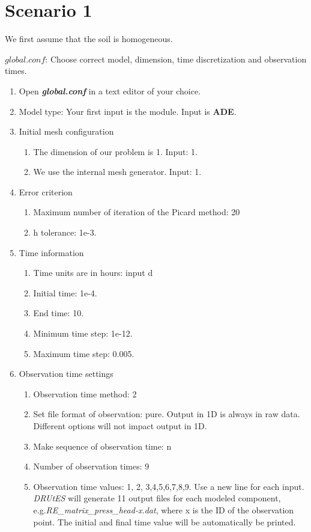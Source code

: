 \section*{Scenario 1}

We first assume that the soil is homogeneous.

$global.conf$: Choose correct model, dimension, time discretization and observation times.
\begin{enumerate}
\item Open \textbf{\emph{global.conf}} in a text editor of your choice. 
\item Model type: Your first input is the module. Input is \textbf{ADE}.
\item Initial mesh configuration \begin{enumerate}
\item The dimension of our problem is 1. Input: 1.
\item We use the internal mesh generator. Input: 1. 
\end{enumerate}
\item Error criterion \begin{enumerate} 
\item Maximum number of iteration of the Picard method: 20 
\item h tolerance: 1e-3.
\end{enumerate}
\item Time information 
\begin{enumerate} 
\item Time units are in hours: input d
\item Initial time: 1e-4.
\item End time: 10.
\item Minimum time step: 1e-12.
\item Maximum time step: 0.005.
\end{enumerate}
\item Observation time settings \begin{enumerate}
\item Observation time method: 2
\item Set file format of observation: pure. Output in 1D is always in raw data. Different options will not impact output in 1D.
\item Make sequence of observation time: n
\item Number of observation times: 9
\item Observation time values: 1, 2, 3,4,5,6,7,8,9. Use a new line for each input. \textit{DRUtES} will generate 11 output files for each modeled component, e.g.\textit{RE\_matrix\_press\_head-x.dat}, where x is the ID of the observation point. The initial and final time value will be automatically be printed.

\end{enumerate}
\end{enumerate}
